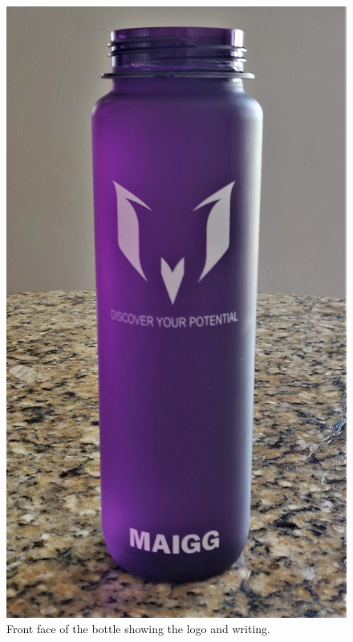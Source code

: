 \documentclass[notitlepage,12pt]{article}
\begin{document}
\begin{figure}[ht]
\begin{minipage}[b]{0.3\textwidth}
        \includegraphics[width=\textwidth]{reference/bottle_face_on.jpg}
        \caption{Front face of the bottle showing the logo and writing.}
        \label{fig:face}
    \end{minipage}
    \hfill
    \begin{minipage}[b]{0.3\textwidth}

\end{minipage}
\end{figure}
\end{document}
